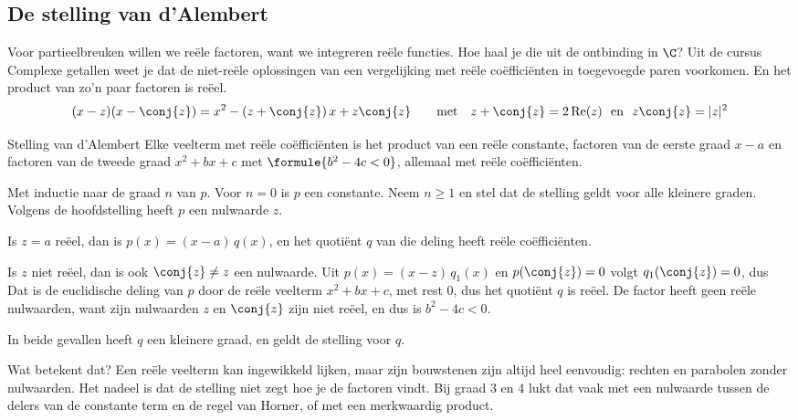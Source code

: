 \subsection{De stelling van d'Alembert}

Voor partieelbreuken willen we reële factoren, want we integreren reële functies. Hoe haal je die uit de ontbinding in $\C$? Uit de cursus Complexe getallen weet je dat de niet-reële oplossingen van een vergelijking met reële coëfficiënten in toegevoegde paren voorkomen. En het product van zo'n paar factoren is reëel.
\[ (x - z)(x - \conj{z}) = x^2 - (z + \conj{z})\,x + z\conj{z} \qquad\text{met}\quad z + \conj{z} = 2\,\mathrm{Re}(z) \ \text{ en } \ z\conj{z} = |z|^2 \]

\begin{theorie}
\begin{stelling}{Stelling van d'Alembert}
Elke veelterm met reële coëfficiënten is het product van een reële constante, factoren van de eerste graad $x - a$ en factoren van de tweede graad $x^2 + bx + c$ met $\formule{b^2 - 4c < 0}$, allemaal met reële coëfficiënten.
\end{stelling}

\begin{bewijs}
Met inductie naar de graad $n$ van $p$. Voor $n = 0$ is $p$ een constante. Neem $n \geqslant 1$ en stel dat de stelling geldt voor alle kleinere graden. Volgens de hoofdstelling heeft $p$ een nulwaarde $z$.

Is $z = a$ reëel, dan is $p(x) = (x - a)\,q(x)$, en het quotiënt $q$ van die deling heeft reële coëfficiënten.

Is $z$ niet reëel, dan is ook $\conj{z} \neq z$ een nulwaarde. Uit $p(x) = (x - z)\,q_1(x)$ en $p(\conj{z}) = 0$ volgt $q_1(\conj{z}) = 0$, dus
Dat is de euclidische deling van $p$ door de reële veelterm $x^2 + bx + c$, met rest 0, dus het quotiënt $q$ is reëel. De factor heeft geen reële nulwaarden, want zijn nulwaarden $z$ en $\conj{z}$ zijn niet reëel, en dus is $b^2 - 4c < 0$.

In beide gevallen heeft $q$ een kleinere graad, en geldt de stelling voor $q$.
\end{bewijs}
\end{theorie}

Wat betekent dat? Een reële veelterm kan ingewikkeld lijken, maar zijn bouwstenen zijn altijd heel eenvoudig: rechten en parabolen zonder nulwaarden. Het nadeel is dat de stelling niet zegt hoe je de factoren vindt. Bij graad 3 en 4 lukt dat vaak met een nulwaarde tussen de delers van de constante term en de regel van Horner, of met een merkwaardig product.

